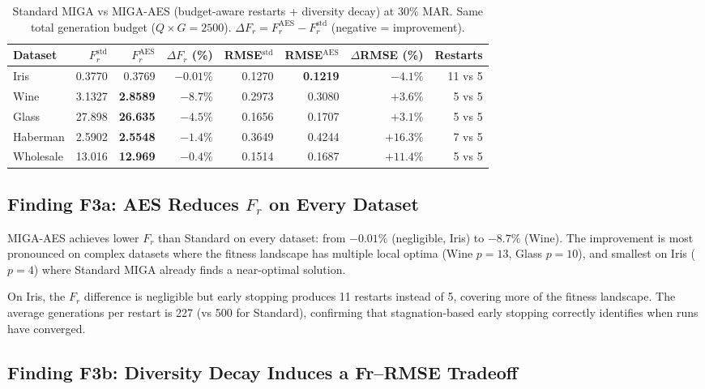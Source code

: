 \begin{table}[h]
\caption{Standard MIGA vs MIGA-AES (budget-aware restarts + diversity decay) at 30\% MAR. Same total generation budget ($Q \times G = 2500$). $\Delta F_r = F_r^{\text{AES}} - F_r^{\text{std}}$ (negative = improvement).}
\label{tab:aes}
\centering
\begin{tabular}{lrrrrrrr}
\toprule
\textbf{Dataset} & $F_r^{\text{std}}$ & $F_r^{\text{AES}}$ & $\Delta F_r$ (\%) & RMSE$^{\text{std}}$ & RMSE$^{\text{AES}}$ & $\Delta$RMSE (\%) & \textbf{Restarts} \\
\midrule
Iris      & 0.3770 & 0.3769 & $-0.01\%$ & 0.1270 & \textbf{0.1219} & $-4.1\%$ & 11 vs 5 \\
Wine      & 3.1327 & \textbf{2.8589} & $-8.7\%$ & 0.2973 & 0.3080 & $+3.6\%$ & 5 vs 5 \\
Glass     & 27.898 & \textbf{26.635} & $-4.5\%$ & 0.1656 & 0.1707 & $+3.1\%$ & 5 vs 5 \\
Haberman  & 2.5902 & \textbf{2.5548} & $-1.4\%$ & 0.3649 & 0.4244 & $+16.3\%$ & 7 vs 5 \\
Wholesale & 13.016 & \textbf{12.969} & $-0.4\%$ & 0.1514 & 0.1687 & $+11.4\%$ & 5 vs 5 \\
\bottomrule
\end{tabular}
\end{table}

\subsection{Finding F3a: AES Reduces $F_r$ on Every Dataset}

MIGA-AES achieves lower $F_r$ than Standard on every dataset: from $-0.01\%$ (negligible, Iris) to $-8.7\%$ (Wine). The improvement is most pronounced on complex datasets where the fitness landscape has multiple local optima (Wine $p=13$, Glass $p=10$), and smallest on Iris ($p=4$) where Standard MIGA already finds a near-optimal solution.

On Iris, the $F_r$ difference is negligible but early stopping produces 11 restarts instead of 5, covering more of the fitness landscape. The average generations per restart is 227 (vs 500 for Standard), confirming that stagnation-based early stopping correctly identifies when runs have converged.

\subsection{Finding F3b: Diversity Decay Induces a Fr--RMSE Tradeoff}


